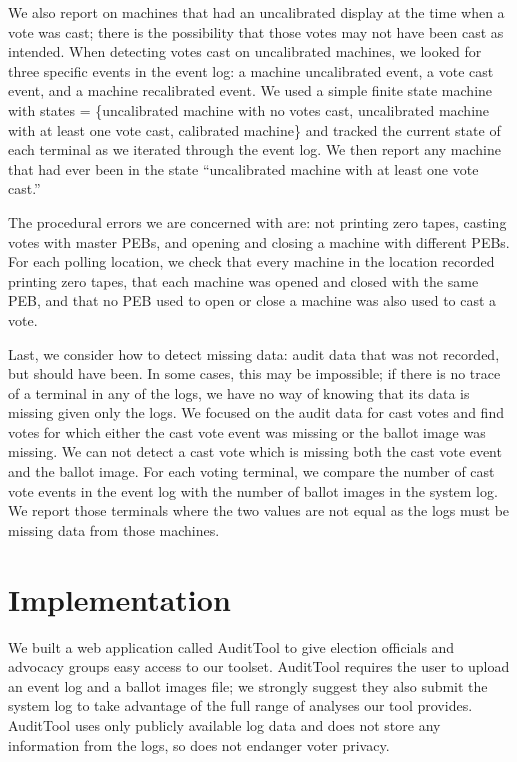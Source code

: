 \documentclass[letterpaper,twocolumn,10pt]{article}
\begin{document}

We also report on machines that had an uncalibrated display at the time when a
vote was cast; there is the possibility that those votes may not have been cast
as intended. When detecting votes cast on uncalibrated machines, we looked for
three specific events in the event log: a machine uncalibrated event, a vote
cast event, and a machine recalibrated event. We used a simple finite state
machine with states = \{uncalibrated machine with no votes cast, uncalibrated
  machine with at least one vote cast, calibrated machine\} and tracked the
current state of each terminal as we iterated through the event log. We then
report any machine that had ever been in the state ``uncalibrated machine with
at least one vote cast.'' 

The procedural errors we are concerned with are: not printing zero tapes,
casting votes with master PEBs, and opening and closing a machine with
different PEBs. For each polling location, we check that every machine in the
location recorded printing zero tapes, that each machine was opened and closed
with the same PEB, and that no PEB used to open or close a machine was also used
to cast a vote.  

Last, we consider how to detect missing data: audit data that was not recorded,
but should have been. In some cases, this may be impossible; if there is no
trace of a terminal in any of the logs, we have no way of knowing that its data
is missing given only the logs. We focused on the audit data for cast votes and
find votes for which either the cast vote event was missing or the ballot image
was missing. We can not detect a cast vote which is missing both the cast vote
event and the ballot image. For each voting terminal, we compare the number of
cast vote events in the event log with the number of ballot images in the system
log. We report those terminals where the two values are not equal as the logs
must be missing data from those machines.  

\section{Implementation}
We built a web application called AuditTool to give election officials and
advocacy groups easy access to our toolset. AuditTool requires the user to
upload an event log and a ballot images file; we strongly suggest they also
submit the system log to take advantage of the full range of analyses our tool
provides. AuditTool uses only publicly available log data and does not store
any information from the logs, so does not endanger voter privacy.  
\end{document}
